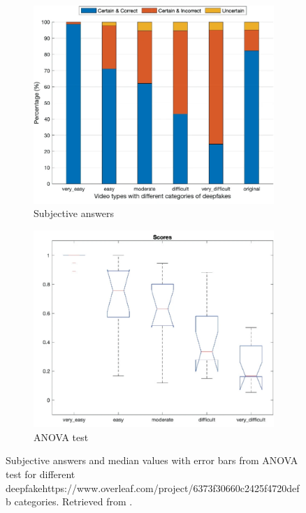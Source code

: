 \begin{figure}[H]
    \begin{subfigure}[h]{.45\linewidth}
        \centering
        \includegraphics[width=1\linewidth]{other-fig/subjective_answers_a.png}
        \caption{Subjective answers}
    \end{subfigure}
    \hfill
    \begin{subfigure}[h]{.45\linewidth}
        \centering
        \includegraphics[width=1\linewidth]{other-fig/subjective_answers_b.png}
        \caption{ANOVA test}
    \end{subfigure}
    \caption{Subjective answers and median values with error bars from ANOVA test for different deepfakehttps://www.overleaf.com/project/6373f30660c2425f4720defb categories. Retrieved from \cite{TheThreatOfDeepfakes}.}
    \label{fig:subjective_answers}
\end{figure}

